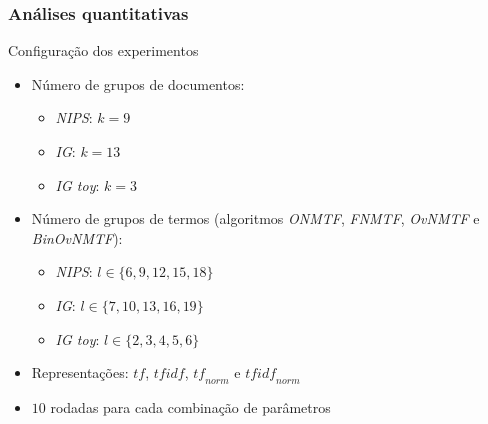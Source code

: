 \documentclass[10pt]{beamer}
\begin{document}





\begin{frame}
\frametitle{Análises quantitativas}

  Configuração dos experimentos
  \begin{itemize}
    \item Número de grupos de documentos:
    \begin{itemize}
      \item \textit{NIPS}: $k = 9$
      \item \textit{IG}: $k = 13$
      \item \textit{IG toy}: $k = 3$
    \end{itemize}
    \item Número de grupos de termos (algoritmos \textit{ONMTF}, \textit{FNMTF}, \textit{OvNMTF} e \textit{BinOvNMTF}):
    \begin{itemize}
    \item \textit{NIPS}: $l \in \{6, 9, 12, 15, 18\}$
    \item \textit{IG}: $l \in \{7, 10, 13, 16, 19\}$
    \item \textit{IG toy}: $l \in \{2, 3, 4, 5, 6\}$
  \end{itemize}
  \item Representações: $\textit{tf}$, $\textit{tfidf}$, $\textit{tf}_{norm}$ e $\textit{tfidf}_{norm}$
  \item $10$ rodadas para cada combinação de parâmetros
  \end{itemize}

\end{frame}
\end{document}
